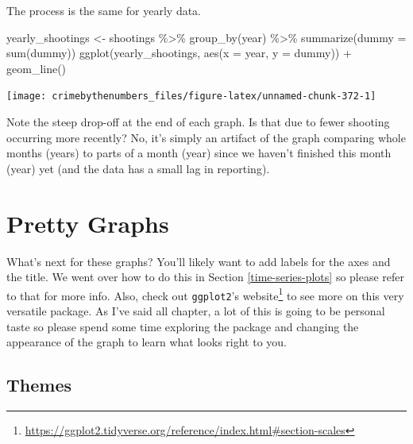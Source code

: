 \documentclass[
]{krantz}
\makeatletter
\newenvironment{Shaded}{\begin{snugshade}}{\end{snugshade}}
\newcommand{\AttributeTok}[1]{\textcolor[rgb]{0.61,0.61,0.61}{#1}}
\newcommand{\FunctionTok}[1]{\textcolor[rgb]{0,0,0}{#1}}
\newcommand{\NormalTok}[1]{#1}
\newcommand{\OtherTok}[1]{\textcolor[rgb]{0.37,0.37,0.37}{#1}}
\newcommand{\SpecialCharTok}[1]{\textcolor[rgb]{0,0,0}{#1}}
\renewcommand{\href}[2]{#2\footnote{\url{#1}}}
\newenvironment{kframe}{%
\medskip{}
\setlength{\fboxsep}{.8em}
 \def\at@end@of@kframe{}%
 \ifinner\ifhmode%
  \def\at@end@of@kframe{\end{minipage}}%
  \begin{minipage}{\columnwidth}%
 \fi\fi%
 \def\FrameCommand##1{\hskip\@totalleftmargin \hskip-\fboxsep
 \colorbox{shadecolor}{##1}\hskip-\fboxsep
     \hskip-\linewidth \hskip-\@totalleftmargin \hskip\columnwidth}%
 \MakeFramed {\advance\hsize-\width
   \@totalleftmargin\z@ \linewidth\hsize
   \@setminipage}}%
 {\par\unskip\endMakeFramed%
 \at@end@of@kframe}
\renewenvironment{Shaded}{\begin{kframe}}{\end{kframe}}
\makeatother
\begin{document}
The process is the same for yearly data.

\begin{Shaded}
\begin{Highlighting}[]
\NormalTok{yearly\_shootings }\OtherTok{\textless{}{-}}\NormalTok{ shootings }\SpecialCharTok{\%\textgreater{}\%}
  \FunctionTok{group\_by}\NormalTok{(year) }\SpecialCharTok{\%\textgreater{}\%} 
  \FunctionTok{summarize}\NormalTok{(}\AttributeTok{dummy =} \FunctionTok{sum}\NormalTok{(dummy))}
\FunctionTok{ggplot}\NormalTok{(yearly\_shootings, }\FunctionTok{aes}\NormalTok{(}\AttributeTok{x =}\NormalTok{ year, }\AttributeTok{y =}\NormalTok{ dummy)) }\SpecialCharTok{+}
  \FunctionTok{geom\_line}\NormalTok{()}
\end{Highlighting}
\end{Shaded}

\begin{center}\texttt{[image: crimebythenumbers\_files/figure-latex/unnamed-chunk-372-1]} \end{center}

Note the steep drop-off at the end of each graph. Is that due to fewer shooting occurring more recently? No, it's simply an artifact of the graph comparing whole months (years) to parts of a month (year) since we haven't finished this month (year) yet (and the data has a small lag in reporting).

\hypertarget{pretty-graphs}{%
\section{Pretty Graphs}\label{pretty-graphs}}

What's next for these graphs? You'll likely want to add labels for the axes and the title. We went over how to do this in Section \ref{time-series-plots} so please refer to that for more info. Also, check out \texttt{ggplot2}'s \href{https://ggplot2.tidyverse.org/reference/index.html\#section-scales}{website} to see more on this very versatile package. As I've said all chapter, a lot of this is going to be personal taste so please spend some time exploring the package and changing the appearance of the graph to learn what looks right to you.

\hypertarget{themes}{%
\subsection{Themes}\label{themes}}
\end{document}
